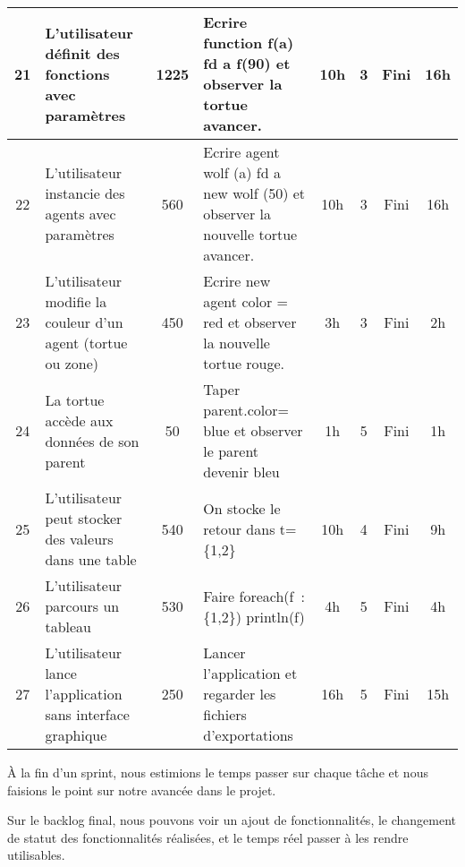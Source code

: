 {\begin{longtable}[c]{|c|p{2cm}|c|p{4cm}|*{4}{c|}}
\hline
21 & L'utilisateur définit des fonctions avec paramètres & 1225 & Ecrire function f(a) { fd a } f(90) et observer la tortue avancer. & 10h & 3 & Fini & 16h \\
\hline
22 & L'utilisateur instancie des agents avec paramètres & 560 & Ecrire agent wolf (a) { fd a } new wolf (50) et observer la nouvelle tortue avancer. & 10h & 3 & Fini & 16h \\
\hline
23 & L'utilisateur modifie la couleur d'un agent (tortue ou zone) & 450 & Ecrire new agent { color = red } et observer la nouvelle tortue rouge. & 3h & 3 & Fini & 2h \\
\hline
24 & La tortue accède aux données de son parent & 50 & Taper parent.color= blue et observer le parent devenir bleu & 1h & 5 & Fini & 1h \\
\hline
25 & L'utilisateur peut stocker des valeurs dans une table & 540 & On stocke le retour dans t= \{1,2\} & 10h & 4 & Fini & 9h \\
\hline
26 & L'utilisateur parcours un tableau & 530 & Faire foreach(f~: \{1,2\}) println(f) & 4h & 5 & Fini & 4h \\
\hline
27 & L'utilisateur lance l'application sans interface graphique & 250 & Lancer l'application et regarder les fichiers d'exportations & 16h & 5 & Fini & 15h \\
\hline
\end{longtable}}
À la fin d'un sprint, nous estimions le temps passer sur chaque tâche et nous faisions le point sur notre avancée dans le projet.

Sur le backlog final, nous pouvons voir un ajout de fonctionnalités, le changement de statut des fonctionnalités réalisées, et le temps réel passer à les rendre utilisables.



